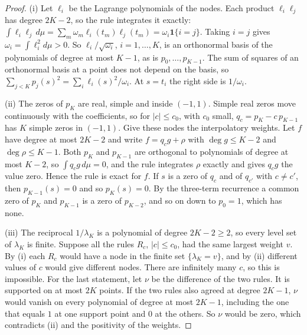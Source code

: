 \documentclass[12pt]{article}
\theoremstyle{definition}
\theoremstyle{remark}
\begin{document}
\begin{proof}
(i) Let $\ell_i$ be the Lagrange polynomials of the nodes. Each product $\ell_i\ell_j$ has degree $2K-2$, so the rule integrates it exactly: $\int\ell_i\ell_j\,d\mu=\sum_m\omega_m\ell_i(t_m)\ell_j(t_m)=\omega_i\mathbf 1\{i=j\}$. Taking $i=j$ gives $\omega_i=\int\ell_i^2d\mu>0$. So $\ell_i/\sqrt{\omega_i}$, $i=1,\ldots,K$, is an orthonormal basis of the polynomials of degree at most $K-1$, as is $p_0,\ldots,p_{K-1}$. The sum of squares of an orthonormal basis at a point does not depend on the basis, so $\sum_{j<K}p_j(s)^2=\sum_i\ell_i(s)^2/\omega_i$. At $s=t_i$ the right side is $1/\omega_i$.

(ii) The zeros of $p_K$ are real, simple and inside $(-1,1)$. Simple real zeros move continuously with the coefficients, so for $|c|\le c_0$, with $c_0$ small, $q_c=p_K-c\,p_{K-1}$ has $K$ simple zeros in $(-1,1)$. Give these nodes the interpolatory weights. Let $f$ have degree at most $2K-2$ and write $f=q_cg+\rho$ with $\deg g\le K-2$ and $\deg\rho\le K-1$. Both $p_K$ and $p_{K-1}$ are orthogonal to polynomials of degree at most $K-2$, so $\int q_cg\,d\mu=0$, and the rule integrates $\rho$ exactly and gives $q_cg$ the value zero. Hence the rule is exact for $f$. If $s$ is a zero of $q_c$ and of $q_{c'}$ with $c\ne c'$, then $p_{K-1}(s)=0$ and so $p_K(s)=0$. By the three-term recurrence a common zero of $p_K$ and $p_{K-1}$ is a zero of $p_{K-2}$, and so on down to $p_0=1$, which has none.

(iii) The reciprocal $1/\lambda_K$ is a polynomial of degree $2K-2\ge2$, so every level set of $\lambda_K$ is finite. Suppose all the rules $R_c$, $|c|\le c_0$, had the same largest weight $v$. By (i) each $R_c$ would have a node in the finite set $\{\lambda_K=v\}$, and by (ii) different values of $c$ would give different nodes. There are infinitely many $c$, so this is impossible. For the last statement, let $\nu$ be the difference of the two rules. It is supported on at most $2K$ points. If the two rules also agreed at degree $2K-1$, $\nu$ would vanish on every polynomial of degree at most $2K-1$, including the one that equals $1$ at one support point and $0$ at the others. So $\nu$ would be zero, which contradicts (ii) and the positivity of the weights.
\end{proof}
\end{document}
